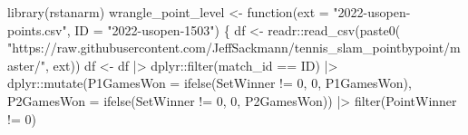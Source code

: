 \documentclass[
  letterpaper,
  DIV=11,
  numbers=noendperiod]{scrartcl}
\newenvironment{Shaded}{\begin{snugshade}}{\end{snugshade}}
\newcommand{\AttributeTok}[1]{\textcolor[rgb]{0.40,0.45,0.13}{#1}}
\newcommand{\ControlFlowTok}[1]{\textcolor[rgb]{0.00,0.23,0.31}{#1}}
\newcommand{\DecValTok}[1]{\textcolor[rgb]{0.68,0.00,0.00}{#1}}
\newcommand{\FunctionTok}[1]{\textcolor[rgb]{0.28,0.35,0.67}{#1}}
\newcommand{\NormalTok}[1]{\textcolor[rgb]{0.00,0.23,0.31}{#1}}
\newcommand{\OtherTok}[1]{\textcolor[rgb]{0.00,0.23,0.31}{#1}}
\newcommand{\SpecialCharTok}[1]{\textcolor[rgb]{0.37,0.37,0.37}{#1}}
\newcommand{\StringTok}[1]{\textcolor[rgb]{0.13,0.47,0.30}{#1}}
\begin{document}
\begin{Shaded}
\begin{Highlighting}[]
\FunctionTok{library}\NormalTok{(rstanarm)}
\NormalTok{wrangle\_point\_level }\OtherTok{\textless{}{-}} \ControlFlowTok{function}\NormalTok{(}\AttributeTok{ext =} \StringTok{"2022{-}usopen{-}points.csv"}\NormalTok{,}
                               \AttributeTok{ID =} \StringTok{"2022{-}usopen{-}1503"}\NormalTok{) \{}
\NormalTok{  df }\OtherTok{\textless{}{-}}\NormalTok{ readr}\SpecialCharTok{::}\FunctionTok{read\_csv}\NormalTok{(}\FunctionTok{paste0}\NormalTok{(}
    \StringTok{"https://raw.githubusercontent.com/JeffSackmann/tennis\_slam\_pointbypoint/master/"}\NormalTok{,}
\NormalTok{                               ext))}
\NormalTok{  df }\OtherTok{\textless{}{-}}\NormalTok{ df }\SpecialCharTok{|\textgreater{}}\NormalTok{ dplyr}\SpecialCharTok{::}\FunctionTok{filter}\NormalTok{(match\_id }\SpecialCharTok{==}\NormalTok{ ID) }\SpecialCharTok{|\textgreater{}}
\NormalTok{    dplyr}\SpecialCharTok{::}\FunctionTok{mutate}\NormalTok{(}\AttributeTok{P1GamesWon =} \FunctionTok{ifelse}\NormalTok{(SetWinner }\SpecialCharTok{!=} \DecValTok{0}\NormalTok{, }\DecValTok{0}\NormalTok{, P1GamesWon),}
                  \AttributeTok{P2GamesWon =} \FunctionTok{ifelse}\NormalTok{(SetWinner }\SpecialCharTok{!=} \DecValTok{0}\NormalTok{, }\DecValTok{0}\NormalTok{, P2GamesWon)) }\SpecialCharTok{|\textgreater{}}
    \FunctionTok{filter}\NormalTok{(PointWinner }\SpecialCharTok{!=} \DecValTok{0}\NormalTok{)}
  

\end{Highlighting}
\end{Shaded}
\end{document}

